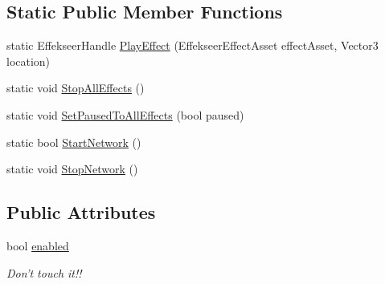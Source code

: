 \subsection*{Static Public Member Functions}
\begin{DoxyCompactItemize}
\item 
static Effekseer\-Handle \hyperlink{class_effekseer_1_1_effekseer_system_a679e2cbf7d99ff2af5db1608e82e9201}{Play\-Effect} (Effekseer\-Effect\-Asset effect\-Asset, Vector3 location)
\item 
static void \hyperlink{class_effekseer_1_1_effekseer_system_a9431e338ba62ded97108c1c04d05ed98}{Stop\-All\-Effects} ()
\item 
static void \hyperlink{class_effekseer_1_1_effekseer_system_adfbdc2b070592e412eb6b560865be455}{Set\-Paused\-To\-All\-Effects} (bool paused)
\item 
static bool \hyperlink{class_effekseer_1_1_effekseer_system_a15a902264fbb68ec2b79bed290175ac9}{Start\-Network} ()
\item 
static void \hyperlink{class_effekseer_1_1_effekseer_system_ae3e8a328c72789ef63670668525b255c}{Stop\-Network} ()
\end{DoxyCompactItemize}
\subsection*{Public Attributes}
\begin{DoxyCompactItemize}
\item 
bool \hyperlink{class_effekseer_1_1_effekseer_system_ab123ea2e4de281b4a3e13616296d343f}{enabled}
\begin{DoxyCompactList}\small\item\em Don't touch it!! \end{DoxyCompactList}\end{DoxyCompactItemize}
